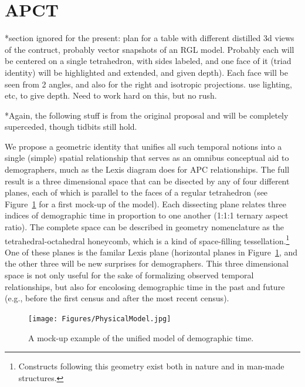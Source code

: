 \documentclass[11pt,oneside,a4paper]{article} %
\begin{document}
\section*{APCT}
*section ignored for the present: plan for a table with different distilled 3d
views of the contruct, probably vector snapshots of an RGL model. Probably each
will be centered on a single tetrahedron, with sides labeled, and one face of
it (triad identity) will be highlighted and extended, and given depth). Each
face will be seen from 2 angles, and also for the right and isotropic
projections. use lighting, etc, to give depth. Need to work hard on this, but no
rush.

*Again, the following stuff is from the original proposal and will be completely
superceded, though tidbits still hold.

 We
propose a geometric identity that unifies all such temporal notions into a single (simple) spatial relationship that serves as an omnibus conceptual aid to demographers, much as the Lexis diagram does for APC relationships. The full result is a three dimensional space that can be disected by any of four different planes, each of which is parallel to the faces of a regular tetrahedron (see
Figure~\ref{fig:APCT} for a first mock-up of the model).
Each dissecting plane relates three indices of demographic time in proportion to one
another (1:1:1 ternary aspect ratio). The complete space can be described in
geometry nomenclature as the tetrahedral-octahedral honeycomb, which is a kind of space-filling tessellation.\footnote{Constructs following
this geometry exist both in nature and in man-made structures.} 
One of these planes is the familar Lexis plane (horizontal planes in
Figure~\ref{fig:APCT}, and the other three will be new surprises for
demographers. This three dimensional space is not only useful for the sake of formalizing observed temporal relationships, but also for encolosing
demographic time in the past and future (e.g., before the first census and after
the most recent census). 

\begin{figure}[!h]
\centering
\caption[cap]{A mock-up example of the unified model of demographic
time.\footnotemark}
\label{fig:APCT}
	\texttt{[image: Figures/PhysicalModel.jpg]}
\end{figure}
\end{document}
